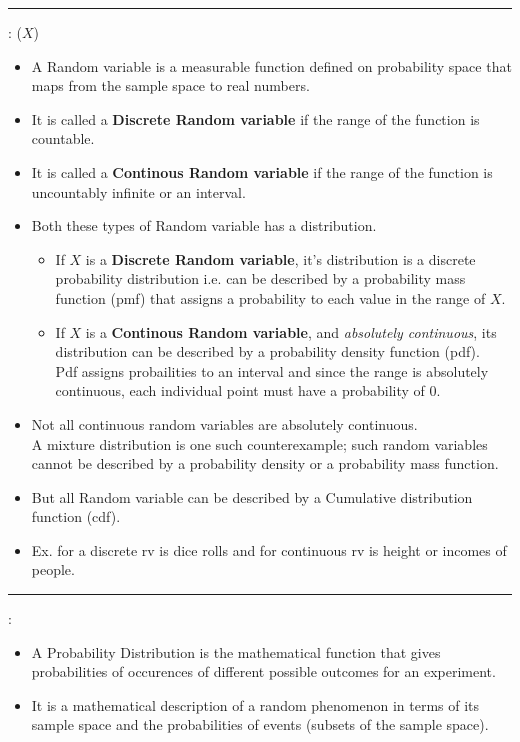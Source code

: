 \documentclass[	DIV=calc,%
paper=a4,%
fontsize=11pt,%
twocolumn]{scrartcl} %
\newcommand{\hformbar}[1]{\vspace{5pt}\hrule\vspace{10pt}} %
\newcommand{\formdesc}[1]{\noindent\textbf{#1}}
\begin{document}
\newpage
\hformbar

\formdesc{Random variable}: ($X$)

\begin{itemize}
	\item A Random variable is a measurable function defined on probability space that maps from the sample space to real numbers.
	\item It is called a \textbf{Discrete Random variable} if the range of the function is countable.
	\item It is called a \textbf{Continous Random variable} if the range of the function is uncountably infinite or an interval.
	\item Both these types of  Random variable has a distribution.
		\begin{itemize}
			\item If $X$ is a \textbf{Discrete Random variable}, it's distribution is a discrete probability distribution i.e. can be described by a probability mass function (pmf) that assigns a probability to each value in the range of  $X$.
			\item If $X$ is a \textbf{Continous Random variable}, and \emph{absolutely continuous}, its distribution can be described by a probability density function (pdf).\\ Pdf assigns probailities to an interval and since the range is absolutely continuous, each individual point must have a probability of 0.
		\end{itemize}
	\item Not all continuous random variables are absolutely continuous.\\ A mixture distribution is one such counterexample; such random variables cannot be described by a probability density or a probability mass function. 
	\item But all Random variable can be described by a Cumulative distribution function (cdf).
	\item Ex. for a discrete rv is dice rolls and for continuous rv is height or incomes of people.
\end{itemize}


\hformbar

\formdesc{Probability Distribution}:

\begin{itemize}
	\item A Probability Distribution is  the mathematical function that gives probabilities of occurences of different possible outcomes for an experiment.
	\item It is a mathematical description of a random phenomenon in terms of its  sample space and the probabilities of events (subsets of the sample space).
\end{itemize}
\end{document}
